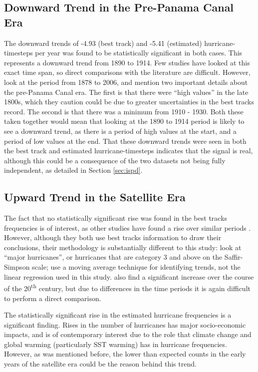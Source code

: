 \documentclass[pdftex,12pt,a4paper]{report}
\newcommand{\ts}{\textsuperscript}
\begin{document}
\subsection{Downward Trend in the Pre-Panama Canal Era}
The downward trends of -4.93 (best track) and -5.41 (estimated) hurricane-timesteps per year was
found to be statistically significant in both cases. This represents a downward trend from 1890 to
1914. Few studies have looked at this exact time span, so direct comparisons with the literature are
difficult. However, \textcite{vecchi2008estimates} look at the period from 1878 to 2006, and mention
two important details about the pre-Panama Canal era. The first is that there were ``high values''
in the late 1800s, which they caution could be due to greater uncertainties in the best tracks
record. The second is that there was a minimum from 1910 - 1930. Both these taken together would
mean that looking at the 1890 to 1914 period is likely to see a downward trend, as there is a period
of high values at the start, and a period of low values at the end. That these downward trends were
seen in both the best track and estimated hurricane-timesteps indicates that the signal is real,
although this could be a consequence of the two datasets not being fully independent, as detailed in
Section \ref{sec:ispd}.

\subsection{Upward Trend in the Satellite Era}

The fact that no statistically significant rise was found in the best tracks frequencies is of
interest, as other studies have found a rise over similar periods \parencite{goldenberg2001recent,
holland2007heightened}. However, although they both use best tracks information to draw their
conclusions, their methodology is substantially different to this study:
\textcite{goldenberg2001recent} look at ``major hurricanes'', or hurricanes that are category 3 and
above on the Saffir-Simpson scale; \textcite{holland2007heightened} use a moving average technique
for identifying trends, not the linear regression used in this study.
\textcite{vecchi2008estimates} also find a significant increase over the course of the 20\ts{th}
century, but due to differences in the time periods it is again difficult to perform a direct
comparison.

The statistically significant rise in the estimated hurricane frequencies is a significant finding.
Rises in the number of hurricanes has major socio-economic impacts, and is of contemporary interest
due to the role that climate change and global warming (particularly SST warming) has in hurricane
frequencies. However, as was mentioned before, the lower than expected counts in the early years of
the satellite era could be the reason behind this trend.
\end{document}
